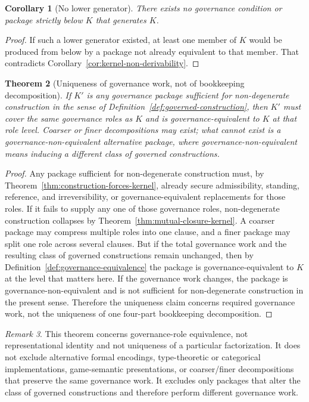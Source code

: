 \documentclass[11pt]{article}
\newtheorem{theorem}{Theorem}[section]
\newtheorem{corollary}[theorem]{Corollary}
\theoremstyle{definition}
\theoremstyle{remark}
\newtheorem{remark}[theorem]{Remark}
\begin{document}
\begin{corollary}[No lower generator]\label{cor:kernel-no-lower-generator}
There exists no governance condition or package strictly below $K$ that generates $K$.
\end{corollary}

\begin{proof}
If such a lower generator existed, at least one member of $K$ would be produced from below by a package not already equivalent to that member. That contradicts Corollary~\ref{cor:kernel-non-derivability}.
\end{proof}

\begin{theorem}[Uniqueness of governance work, not of bookkeeping decomposition]\label{thm:governance-work-uniqueness}
If $K'$ is any governance package sufficient for non-degenerate construction in the sense of Definition~\ref{def:governed-construction}, then $K'$ must cover the same governance roles as $K$ and is governance-equivalent to $K$ at that role level. Coarser or finer decompositions may exist; what cannot exist is a governance-non-equivalent alternative package, where governance-non-equivalent means inducing a different class of governed constructions.
\end{theorem}

\begin{proof}
Any package sufficient for non-degenerate construction must, by Theorem~\ref{thm:construction-forces-kernel}, already secure admissibility, standing, reference, and irreversibility, or governance-equivalent replacements for those roles. If it fails to supply any one of those governance roles, non-degenerate construction collapses by Theorem~\ref{thm:mutual-closure-kernel}. A coarser package may compress multiple roles into one clause, and a finer package may split one role across several clauses. But if the total governance work and the resulting class of governed constructions remain unchanged, then by Definition~\ref{def:governance-equivalence} the package is governance-equivalent to $K$ at the level that matters here. If the governance work changes, the package is governance-non-equivalent and is not sufficient for non-degenerate construction in the present sense. Therefore the uniqueness claim concerns required governance work, not the uniqueness of one four-part bookkeeping decomposition.
\end{proof}

\begin{remark}
This theorem concerns governance-role equivalence, not representational identity and not uniqueness of a particular factorization. It does not exclude alternative formal encodings, type-theoretic or categorical implementations, game-semantic presentations, or coarser/finer decompositions that preserve the same governance work. It excludes only packages that alter the class of governed constructions and therefore perform different governance work.
\end{remark}
\end{document}
